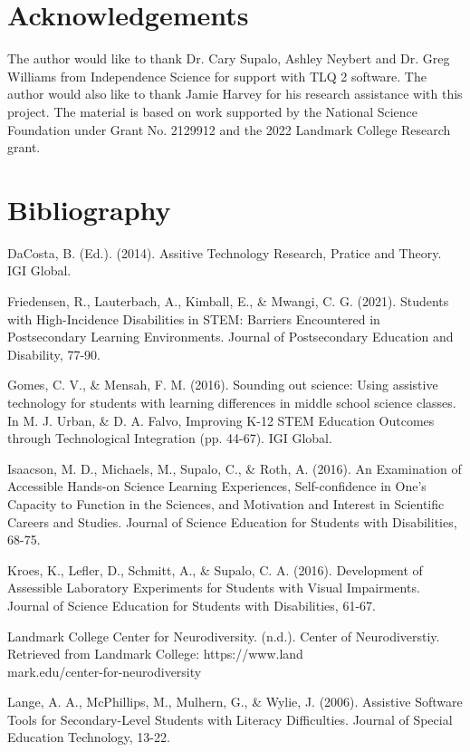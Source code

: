 \documentclass[11.5pt]{sig-alternate}
\begin{document}
\begin{large}
\section*{Acknowledgements}
The author would like to thank Dr. Cary Supalo, Ashley Neybert and Dr. Greg Williams from Independence Science for support with TLQ 2 software. The author would also like to thank Jamie Harvey for his research assistance with this project. The material is based on work supported by the National Science Foundation under Grant No. 2129912 and the 2022 Landmark College Research grant.

\newpage
\section*{Bibliography}\par 

\leftskip 0.25in
\parindent -0.25in 

DaCosta, B. (Ed.). (2014). Assitive Technology Research, Pratice and Theory. IGI Global.

Friedensen, R., Lauterbach, A., Kimball, E., \& Mwangi, C. G. (2021). Students with High-Incidence Disabilities in STEM: Barriers Encountered in Postsecondary Learning Environments. Journal of Postsecondary Education and Disability, 77-90.

Gomes, C. V., \& Mensah, F. M. (2016). Sounding out science: Using assistive technology for students with learning differences in middle school science classes. In M. J. Urban, \& D. A. Falvo, Improving K-12 STEM Education Outcomes through Technological Integration (pp. 44-67). IGI Global.

Isaacson, M. D., Michaels, M., Supalo, C., \& Roth, A. (2016). An Examination of Accessible Hands-on Science Learning Experiences, Self-confidence in One's Capacity to Function in the Sciences, and Motivation and Interest in Scientific Careers and Studies. Journal of Science Education for Students with Disabilities, 68-75.

Kroes, K., Lefler, D., Schmitt, A., \& Supalo, C. A. (2016). Development of Assessible Laboratory Experiments for Students with Visual Impairments. Journal of Science Education for Students with Disabilities, 61-67.

Landmark College Center for Neurodiversity. (n.d.). Center of Neurodiverstiy. Retrieved from Landmark College: https://www.land\\mark.edu/center-for-neurodiversity

Lange, A. A., McPhillips, M., Mulhern, G., \& Wylie, J. (2006). Assistive Software Tools for Secondary-Level Students with Literacy Difficulties. Journal of Special Education Technology, 13-22.


\end{large}
\end{document}
